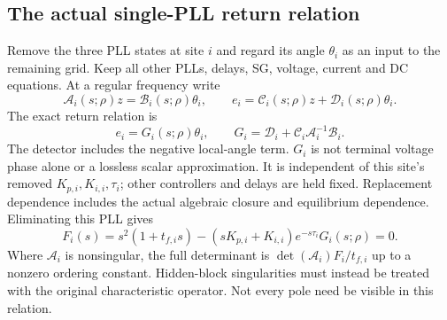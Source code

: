 \documentclass[11pt]{article}
\begin{document}
\subsection{The actual single-PLL return relation}
Remove the three PLL states at site $i$ and regard its angle $\theta_i$
as an input to the remaining grid. Keep all other PLLs, delays, SG,
voltage, current and DC equations. At a regular frequency write
\[
 \mathcal A_i(s;\rho)z=\mathcal B_i(s;\rho)\theta_i,\qquad
 e_i=\mathcal C_i(s;\rho)z+\mathcal D_i(s;\rho)\theta_i .
\]
The exact return relation is
\begin{equation}
 e_i=G_i(s;\rho)\theta_i,\qquad
 G_i=\mathcal D_i+\mathcal C_i\mathcal A_i^{-1}\mathcal B_i .
 \label{eq:return}
\end{equation}
The detector includes the negative local-angle term. $G_i$ is not
terminal voltage phase alone or a lossless scalar approximation.
It is independent of this site's removed $K_{p,i},K_{i,i},\tau_i$;
other controllers and delays are held fixed. Replacement dependence
includes the actual algebraic closure and equilibrium dependence.
Eliminating this PLL gives
\begin{equation}
 F_i(s)=s^2(1+t_{f,i}s)
 -(sK_{p,i}+K_{i,i})e^{-s\tau_i}G_i(s;\rho)=0 . \label{eq:scalarroot}
\end{equation}
Where $\mathcal A_i$ is nonsingular, the full determinant is
$\det(\mathcal A_i)F_i/t_{f,i}$ up to a nonzero ordering constant.
Hidden-block singularities must instead be treated with the original
characteristic operator. Not every pole need be visible in this relation.
\end{document}
